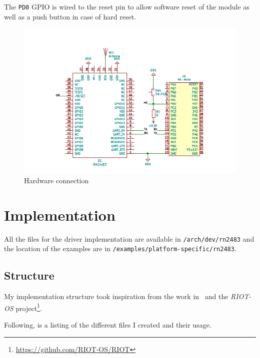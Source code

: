 The \lstinline{PD0} GPIO is wired to the reset pin to allow
software reset of the module as well as a push button in case of hard reset.

\begin{figure}[H]
  \centering
  \includegraphics[scale=0.70]{thesis.tex/chapters/driver/fig/conn_diag.pdf}
  \caption{Hardware connection\label{fig:schemaconn}}
\end{figure}

\section{Implementation}

All the files for the driver implementation are available in
\lstinline{/arch/dev/rn2483} and the location of the examples are in
\lstinline{/examples/platform-specific/rn2483}.

\subsection{Structure}

My implementation structure took inspiration from the work 
in~\cite{8847137} and the \emph{RIOT-OS}
project\footnote{\url{https://github.com/RIOT-OS/RIOT}}. 

Following, is a listing of the different files I created and their
usage. %

